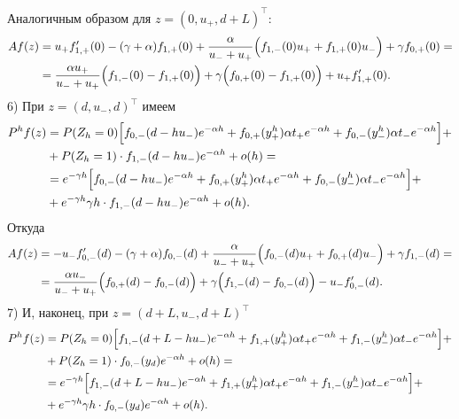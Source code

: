 \documentclass[12pt,a4paper]{article}
\begin{document}
Аналогичным образом для $z = \left(0, u_+, d + L\right)^\intercal$:
\begin{equation*}
    \begin{aligned}
   A f(z) &= u_+ f_{1,+}' (0) - (\gamma + \alpha) f_{1,+} (0) + \frac{\alpha}{u_- + u_+} \Bigl(f_{1,-} (0) u_+ + f_{1,+} (0) u_- \Bigr) + \gamma f_{0,+} (0) = \\
& = \frac{\alpha u_+}{u_- + u_+} \Bigl(f_{1,-} (0) - f_{1,+} (0)\Bigr) + \gamma \Bigl( f_{0,+} (0) - f_{1,+} (0) \Bigr) + u_+ f_{1,+}' (0).
    \end{aligned}
\end{equation*}
6) При $z = \left(d, u_-, d\right)^\intercal$ имеем
\begin{equation*}
    \begin{aligned} 
  P^h f (z) &= P (Z_h = 0) \Bigl[f_{0,-} (d - h u_-) e^{- \alpha h} + f_{0,+} (y^h_+) \alpha t_+ e^{- \alpha h} + f_{0,-} (y^h_- ) \alpha t_- e^{- \alpha h} \Bigr]  + \\
  & + P (Z_h = 1) \cdot f_{1, -} (d - h u_-) e^{- \alpha h} + o (h) =\\
  & = e^{- \gamma h} \Bigl[f_{0,-} (d - h u_-) e^{- \alpha h} + f_{0,+} (y^h_+) \alpha t_+ e^{- \alpha h} + f_{0,-} (y^h_- ) \alpha t_- e^{- \alpha h} \Bigr] +\\
  & + e^{- \gamma h} \gamma h \cdot f_{1, -} (d - h u_-) e^{- \alpha h} + o(h).
\end{aligned}
\end{equation*}
Откуда
\begin{equation*}
    \begin{aligned}
   A f(z) &= -u_- f_{0,-}' (d) - (\gamma + \alpha) f_{0,-} (d) + \frac{\alpha}{u_- + u_+} \Bigl(f_{0,-} (d) u_+ + f_{0,+} (d) u_- \Bigr) + \gamma f_{1,-} (d) = \\
& = \frac{\alpha u_-}{u_- + u_+} \Bigl(f_{0,+} (d) - f_{0,-} (d)\Bigr) + \gamma \Bigl( f_{1,-} (d) - f_{0,-} (d) \Bigr) - u_- f_{0,-}' (d).
    \end{aligned}
\end{equation*}
7) И, наконец, при $z = \left(d + L, u_-, d + L\right)^\intercal$
\begin{equation*}
    \begin{aligned} 
  P^h f (z) &= P (Z_h = 0) \Bigl[f_{1,-} (d + L - h u_-) e^{- \alpha h} + f_{1,+} (y^h_+) \alpha t_+ e^{- \alpha h} + f_{1,-} (y^h_- ) \alpha t_- e^{- \alpha h} \Bigr]  + \\
  & + P (Z_h = 1) \cdot f_{0, -} (y_d) e^{- \alpha h} + o (h) =\\
  & = e^{- \gamma h} \Bigl[f_{1,-} (d + L - h u_-) e^{- \alpha h} + f_{1,+} (y^h_+) \alpha t_+ e^{- \alpha h} + f_{1,-} (y^h_- ) \alpha t_- e^{- \alpha h} \Bigr] +\\
  & + e^{- \gamma h} \gamma h \cdot f_{0, -} (y_d) e^{- \alpha h} + o(h).
\end{aligned}
\end{equation*}
\end{document}
